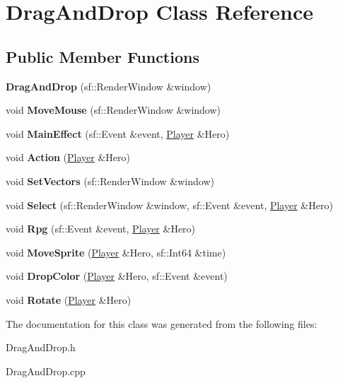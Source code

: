 \hypertarget{class_drag_and_drop}{}\section{Drag\+And\+Drop Class Reference}
\label{class_drag_and_drop}
\subsection*{Public Member Functions}
\begin{DoxyCompactItemize}
\item 
\mbox{\label{class_drag_and_drop_aad31690e074467557cb441c35309533c}} 
{\bfseries Drag\+And\+Drop} (sf\+::\+Render\+Window \&window)
\item 
\mbox{\label{class_drag_and_drop_ab6230272a81c91f859d810132ab78475}} 
void {\bfseries Move\+Mouse} (sf\+::\+Render\+Window \&window)
\item 
\mbox{\label{class_drag_and_drop_a988d844560b5cc186b19b0a1d01ba5f6}} 
void {\bfseries Main\+Effect} (sf\+::\+Event \&event, \hyperlink{class_player}{Player} \&Hero)
\item 
\mbox{\label{class_drag_and_drop_a9c7dc3f6e9ed4207e620d72da5cfd24a}} 
void {\bfseries Action} (\hyperlink{class_player}{Player} \&Hero)
\item 
\mbox{\label{class_drag_and_drop_a2a08096bda61d65d0065a36914473768}} 
void {\bfseries Set\+Vectors} (sf\+::\+Render\+Window \&window)
\item 
\mbox{\label{class_drag_and_drop_aeac40553c39889501ef8b27964835c90}} 
void {\bfseries Select} (sf\+::\+Render\+Window \&window, sf\+::\+Event \&event, \hyperlink{class_player}{Player} \&Hero)
\item 
\mbox{\label{class_drag_and_drop_a99a6ff107cc3495bf0526d585dc6aa63}} 
void {\bfseries Rpg} (sf\+::\+Event \&event, \hyperlink{class_player}{Player} \&Hero)
\item 
\mbox{\label{class_drag_and_drop_ad15d9ee16278025b418b9d468e3b5250}} 
void {\bfseries Move\+Sprite} (\hyperlink{class_player}{Player} \&Hero, sf\+::\+Int64 \&time)
\item 
\mbox{\label{class_drag_and_drop_ad800ef9848505746c7e8479bfe57dd70}} 
void {\bfseries Drop\+Color} (\hyperlink{class_player}{Player} \&Hero, sf\+::\+Event \&event)
\item 
\mbox{\label{class_drag_and_drop_a57e90c907e9037dc80bfef7c755e8840}} 
void {\bfseries Rotate} (\hyperlink{class_player}{Player} \&Hero)
\end{DoxyCompactItemize}


The documentation for this class was generated from the following files\+:\begin{DoxyCompactItemize}
\item 
Drag\+And\+Drop.\+h\item 
Drag\+And\+Drop.\+cpp\end{DoxyCompactItemize}
